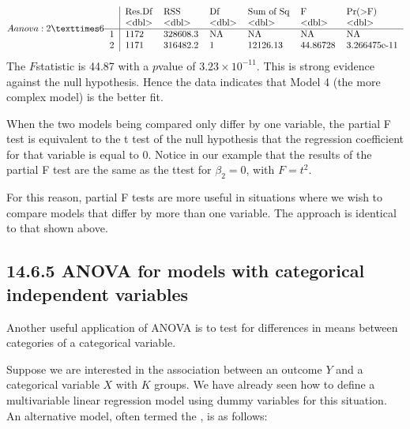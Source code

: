 \documentclass[letterpaper,10pt,english]{jupyterBook}
\begin{document}
\begin{sphinxVerbatim}[commandchars=\\\{\}]
 
\end{sphinxVerbatim}
\begin{equation*}
\begin{split}A anova: 2 × 6
\begin{tabular}{r|llllll}
  & Res.Df & RSS & Df & Sum of Sq & F & Pr(>F)\\
  & <dbl> & <dbl> & <dbl> & <dbl> & <dbl> & <dbl>\\
\hline
	1 & 1172 & 328608.3 & NA &       NA &       NA &           NA\\
	2 & 1171 & 316482.2 &  1 & 12126.13 & 44.86728 & 3.266475e-11\\
\end{tabular}\end{split}
\end{equation*}
\sphinxAtStartPar
The \(F\)\sphinxhyphen{}statistic is 44.87 with a \(p\)\sphinxhyphen{}value of \(3.23\times 10^{-11}\). This is strong evidence against the null hypothesis. Hence the data indicates that Model 4 (the more complex model) is the better fit.

\sphinxAtStartPar
When the two models being compared only differ by one variable, the partial F test is equivalent to the t test of the null hypothesis that the regression coefficient for that variable is equal to 0. Notice in our example that the results of the partial F test are the same as the t\sphinxhyphen{}test for \(\beta_2=0\), with \(F=t^2\).

\sphinxAtStartPar
For this reason, partial F tests are more useful in situations where we wish to compare models that differ by more than one variable. The approach is identical to that shown above.


\subsection{14.6.5 ANOVA for models with categorical independent variables}
\label{\detokenize{14.g. Linear Regression III:anova-for-models-with-categorical-independent-variables}}
\sphinxAtStartPar
Another useful application of ANOVA is to test for differences in means between categories of a categorical variable.

\sphinxAtStartPar
Suppose we are interested in the association between an outcome \(Y\) and a categorical variable \(X\) with \(K\) groups. We have already seen how to define a multivariable linear regression model using dummy variables for this situation. An alternative model, often termed the , is as follows:
\end{document}
